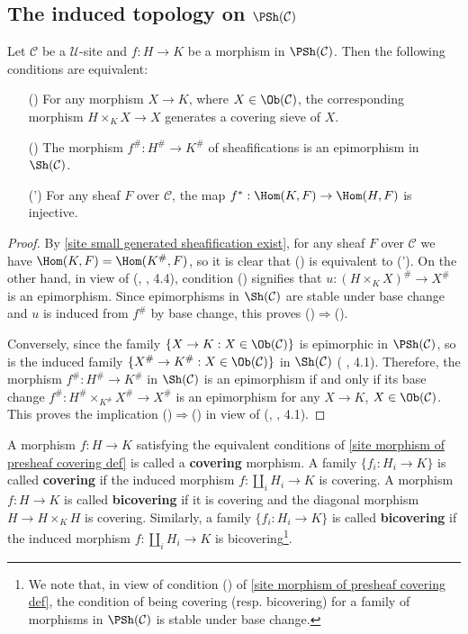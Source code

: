 \subsection{The induced topology on \texorpdfstring{$\PSh(\mathcal{C})$}{Sh}}
\begin{proposition}\label{site morphism of presheaf covering def}
Let $\mathcal{C}$ be a $\mathscr{U}$-site and $f:H\to K$ be a morphism in $\PSh(\mathcal{C})$. Then the following conditions are equivalent:
\begin{enumerate}
\item[(\rmnum{1})] For any morphism $X\to K$, where $X\in\Ob(\mathcal{C})$, the corresponding morphism $H\times_KX\to X$ generates a covering sieve of $X$.
\item[(\rmnum{2})] The morphism $f^\#:H^\#\to K^\#$ of sheafifications is an epimorphism in $\Sh(\mathcal{C})$.
\item[(\rmnum{2}')] For any sheaf $F$ over $\mathcal{C}$, the map $f^*:\Hom(K,F)\to \Hom(H,F)$ is injective.
\end{enumerate}
\end{proposition}
\begin{proof}
By \cref{site small generated sheafification exist}, for any sheaf $F$ over $\mathcal{C}$ we have $\Hom(K,F)=\Hom(K^\#,F)$, so it is clear that () is equivalent to ('). On the other hand, in view of (\cite{SGA4-1}, , 4.4), condition () signifies that $u:(H\times_KX)^\#\to X^\#$ is an epimorphism. Since epimorphisms in $\Sh(\mathcal{C})$ are stable under base change and $u$ is induced from $f^\#$ by base change, this proves ()$\Rightarrow$().\par
Conversely, since the family $\{X\to K:X\in\Ob(\mathcal{C})\}$ is epimorphic in $\PSh(\mathcal{C})$, so is the induced family $\{X^\#\to K^\#:X\in\Ob(\mathcal{C})\}$ in $\Sh(\mathcal{C})$ (\cite{SGA4-1} , 4.1). Therefore, the morphism $f^\#:H^\#\to K^\#$ in $\Sh(\mathcal{C})$ is an epimorphism if and only if its base change $f^\#:H^\#\times_{K^\#}X^\#\to X^\#$ is an epimorphism for any $X\to K$, $X\in\Ob(\mathcal{C})$. This proves the implication ()$\Rightarrow$() in view of (\cite{SGA4-1}, , 4.1).
\end{proof}
A morphism $f:H\to K$ satisfying the equivalent conditions of \cref{site morphism of presheaf covering def} is called a \textbf{covering} morphism. A family $\{f_i:H_i\to K\}$ is called \textbf{covering} if the induced morphism $f:\coprod_iH_i\to K$ is covering. A morphism $f:H\to K$ is called \textbf{bicovering} if it is covering and the diagonal morphism $H\to H\times_KH$ is covering. Similarly, a family $\{f_i:H_i\to K\}$ is called \textbf{bicovering} if the induced morphism $f:\coprod_iH_i\to K$ is bicovering\footnote{We note that, in view of condition () of \cref{site morphism of presheaf covering def}, the condition of being covering (resp. bicovering) for a family of morphisms in $\PSh(\mathcal{C})$ is stable under base change.}.\par
